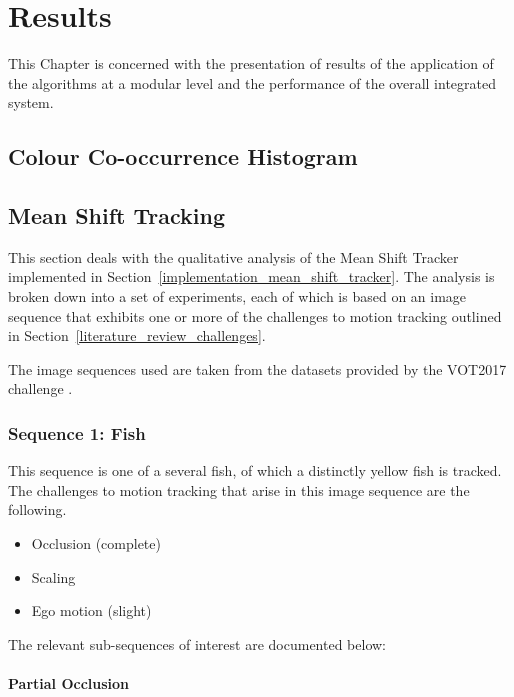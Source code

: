 \chapter{Results} \label{chapter_results}

This Chapter is concerned with the presentation of results of the application of
the algorithms at a modular level and the performance of the overall integrated system.

\section{Colour Co-occurrence Histogram}


\section{Mean Shift Tracking}
This section deals with the qualitative analysis of the Mean Shift Tracker
implemented in Section~\ref{implementation_mean_shift_tracker}. The analysis is
broken down into a set of experiments, each of which is based on an image
sequence that exhibits one or more of the challenges to motion tracking outlined
in Section~\ref{literature_review_challenges}. 

The image sequences used are taken from the datasets provided by the VOT2017
challenge \cite{VOT_TPAMI}.

\subsection{Sequence 1: Fish}
This sequence is one of a several fish, of which a distinctly yellow fish is
tracked. The challenges to motion tracking that arise in this image sequence are the following.
\begin{itemize}
    \item Occlusion (complete)
    \item Scaling 
    \item Ego motion (slight) 
\end{itemize}

The relevant sub-sequences of interest are documented below:

\subsubsection{Partial Occlusion}

